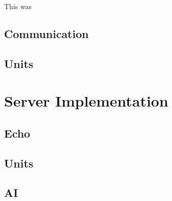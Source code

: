 This was 

\subsection{Communication}


\subsection{Units}



\section{Server Implementation}


\subsection{Echo}

\subsection{Units}

\subsection{AI}
